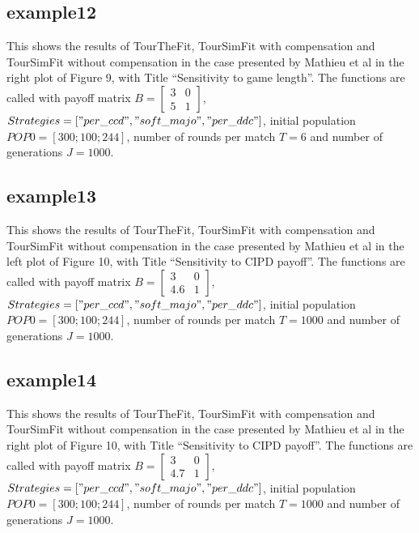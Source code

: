 \documentclass[12pt]{article}
\begin{document}
\subsection{example12}
This shows the results of TourTheFit, TourSimFit with compensation and TourSimFit without compensation in the case presented by Mathieu et al in the right plot of Figure 9, with Title ``Sensitivity to game length''. The functions are called with payoff matrix $B = \begin{bmatrix} 3 & 0 \\ 5 & 1 \end{bmatrix}$, $Strategies = ["per\_ccd", "soft\_majo", "per\_ddc"]$, initial population $POP0 = [300; 100; 244]$, number of rounds per match $T = 6$ and number of generations $J = 1000$.

\subsection{example13}
This shows the results of TourTheFit, TourSimFit with compensation and TourSimFit without compensation in the case presented by Mathieu et al in the left plot of Figure 10, with Title ``Sensitivity to CIPD payoff''. The functions are called with payoff matrix $B = \begin{bmatrix} 3 & 0 \\ 4.6 & 1 \end{bmatrix}$, $Strategies = ["per\_ccd", "soft\_majo", "per\_ddc"]$, initial population $POP0 = [300; 100; 244]$, number of rounds per match $T = 1000$ and number of generations $J = 1000$.

\subsection{example14}
This shows the results of TourTheFit, TourSimFit with compensation and TourSimFit without compensation in the case presented by Mathieu et al in the right plot of Figure 10, with Title ``Sensitivity to CIPD payoff''. The functions are called with payoff matrix $B = \begin{bmatrix} 3 & 0 \\ 4.7 & 1 \end{bmatrix}$, $Strategies = ["per\_ccd", "soft\_majo", "per\_ddc"]$, initial population $POP0 = [300; 100; 244]$, number of rounds per match $T = 1000$ and number of generations $J = 1000$.
\end{document}
